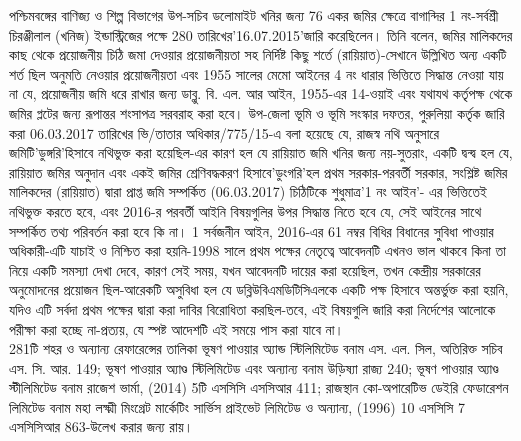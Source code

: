\documentclass[12pt,a4paper]{article}
\newcommand{\bn}[1]{{\bengalifont #1}}
\newcommand{\bn}[1]{{\bengalifont #1}}
\begin{document}
\begin{center}
{{\bn{পশ্চিমবঙ্গের বাণিজ্য ও শিল্প বিভাগের উপ-সচিব ডলোমাইট খনির জন্য 76 একর জমির ক্ষেত্রে বাগান্দির 1 নং-সর্বশ্রী চিরঞ্জীলাল (খনিজ) ইন্ডাস্ট্রিজের পক্ষে 280 তারিখের'16.07.2015'জারি করেছিলেন। তিনি বলেন, জমির মালিকদের কাছ থেকে প্রয়োজনীয় চিঠি জমা দেওয়ার প্রয়োজনীয়তা সহ নির্দিষ্ট কিছু শর্তে (রায়িয়াত)-সেখানে উল্লিখিত অন্য একটি শর্ত ছিল অনুমতি নেওয়ার প্রয়োজনীয়তা এবং 1955 সালের মেমো আইনের 4 নং ধারার ভিত্তিতে সিদ্ধান্ত নেওয়া যায় না যে, প্রয়োজনীয় জমি ধরে রাখার জন্য ডাব্লু. বি. এল. আর আইন, 1955-এর 14-ওয়াই এবং যথাযথ কর্তৃপক্ষ থেকে জমির প্লটের জন্য রূপান্তর শংসাপত্র সরবরাহ করা হবে। উপ-জেলা ভূমি ও ভূমি সংস্কার দফতর, পুরুলিয়া কর্তৃক জারি করা 06.03.2017 তারিখের ভি/তাতার অধিকার/775/15-এ বলা হয়েছে যে, রাজস্ব নথি অনুসারে জমিটি'ডুঙ্গরি'হিসাবে নথিভুক্ত করা হয়েছিল-এর কারণ হল যে রায়িয়াত জমি খনির জন্য নয়-সুতরাং, একটি দ্বন্দ্ব হল যে, রায়িয়াত জমির অনুদান এবং একই জমির শ্রেণিবদ্ধকরণ হিসাবে'ডুংগরি'হল প্রথম সরকার-পরবর্তী সরকার, সংশ্লিষ্ট জমির মালিকদের (রায়িয়াত) দ্বারা প্রাপ্ত জমি সম্পর্কিত (06.03.2017) চিঠিটিকে শুধুমাত্র'1 নং আইন'- এর ভিত্তিতেই নথিভুক্ত করতে হবে, এবং 2016-র পরবর্তী আইনি বিষয়গুলির উপর সিদ্ধান্ত নিতে হবে যে, সেই আইনের সাথে সম্পর্কিত তথ্য পরিবর্তন করা হবে কি না। 1 সর্বজনীন আইন, 2016-এর 61 নম্বর বিধির বিধানের সুবিধা পাওয়ার অধিকারী-এটি যাচাই ও নিশ্চিত করা হয়নি-1998 সালে প্রথম পক্ষের নেতৃত্বে আবেদনটি এখনও ভাল থাকবে কিনা তা নিয়ে একটি সমস্যা দেখা দেবে, কারণ সেই সময়, যখন আবেদনটি দায়ের করা হয়েছিল, তখন কেন্দ্রীয় সরকারের অনুমোদনের প্রয়োজন ছিল-আরেকটি অসুবিধা হল যে ডব্লিউবিএমডিটিসিএলকে একটি পক্ষ হিসাবে অন্তর্ভুক্ত করা হয়নি, যদিও এটি সর্বদা প্রথম পক্ষের দ্বারা করা দাবির বিরোধিতা করছিল-তবে, এই বিষয়গুলি জারি করা নির্দেশের আলোকে পরীক্ষা করা হচ্ছে না-প্রত্যয়, যে স্পষ্ট আদেশটি এই সময়ে পাস করা যাবে না।\\[4pt]
\bn{281টি শহর ও অন্যান্য রেফারেন্সের তালিকা ভূষণ পাওয়ার অ্যান্ড স্টিলিমিটেড বনাম এস. এল. সিল, অতিরিক্ত সচিব এস. সি. আর. 149; ভূষণ পাওয়ার অ্যাণ্ড স্টিলিমিটেড এবং অন্যান্য বনাম উড়িষ্যা রাজ্য 240; ভূষণ পাওয়ার অ্যাণ্ড স্টীলিমিটেড বনাম রাজেশ ভার্মা, (2014) 5টি এসসিসি এসসিআর 411; রাজস্থান কো-অপারেটিভ ডেইরি ফেডারেশন লিমিটেড বনাম মহা লক্ষ্মী মিংগ্রেট মার্কেটিং সার্ভিস প্রাইভেট লিমিটেড ও অন্যান্য, (1996) 10 এসসিসি 7 এসসিসিআর 863-উলেখ করার জন্য রায়।\\[4pt]
}}}}
\end{center}
\end{document}
